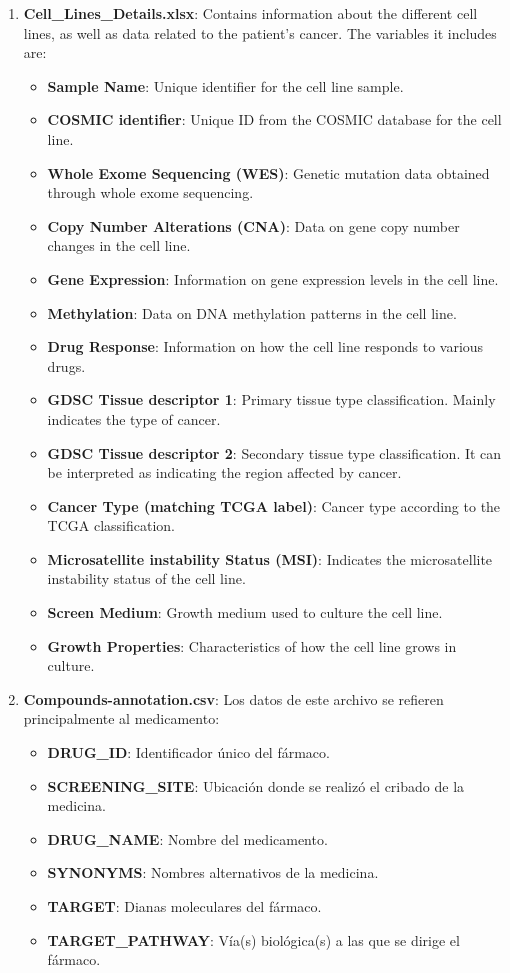 \begin{enumerate}
    \item \textbf{Cell\_Lines\_Details.xlsx}: Contains information about the different cell lines, as well as data related to the patient's cancer. The variables it includes are:
      \begin{itemize}
        \item \textbf{Sample Name}: Unique identifier for the cell line sample.
        \item \textbf{COSMIC identifier}: Unique ID from the COSMIC database for the cell line.
        \item \textbf{Whole Exome Sequencing (WES)}: Genetic mutation data obtained through whole exome sequencing.
        \item \textbf{Copy Number Alterations (CNA)}: Data on gene copy number changes in the cell line.
        \item \textbf{Gene Expression}: Information on gene expression levels in the cell line.
        \item \textbf{Methylation}: Data on DNA methylation patterns in the cell line.
        \item \textbf{Drug Response}: Information on how the cell line responds to various drugs.
        \item \textbf{GDSC Tissue descriptor 1}: Primary tissue type classification. Mainly indicates the type of cancer.
        \item \textbf{GDSC Tissue descriptor 2}: Secondary tissue type classification. It can be interpreted as indicating the region affected by cancer.
        \item \textbf{Cancer Type (matching TCGA label)}: Cancer type according to the TCGA classification.
        \item \textbf{Microsatellite instability Status (MSI)}: Indicates the microsatellite instability status of the cell line.
        \item \textbf{Screen Medium}: Growth medium used to culture the cell line.
        \item \textbf{Growth Properties}: Characteristics of how the cell line grows in culture.
      \end{itemize}

      \item \textbf{Compounds-annotation.csv}: Los datos de este archivo se refieren principalmente al medicamento:
      \begin{itemize}
        \item \textbf{DRUG\_ID}: Identificador único del fármaco.
        \item \textbf{SCREENING\_SITE}: Ubicación donde se realizó el cribado de la medicina.
        \item \textbf{DRUG\_NAME}: Nombre del medicamento.
        \item \textbf{SYNONYMS}: Nombres alternativos de la medicina.
        \item \textbf{TARGET}: Dianas moleculares del fármaco.
        \item \textbf{TARGET\_PATHWAY}: Vía(s) biológica(s) a las que se dirige el fármaco.
      \end{itemize}


\end{enumerate}
